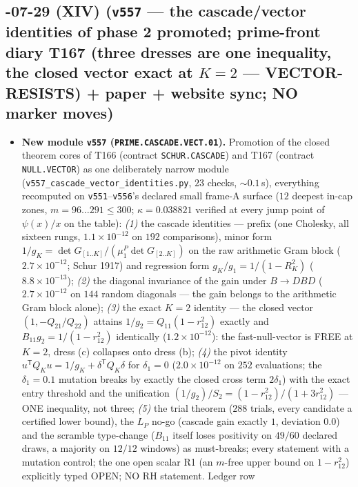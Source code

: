 \documentclass[11pt]{article}
\begin{document}
\subsection*{-07-29 (XIV) (\texttt{v557} --- the cascade/vector identities of phase 2 promoted; prime-front diary T167 (three dresses are one inequality, the closed vector exact at $K=2$ --- VECTOR-RESISTS) + paper + website sync; NO marker moves)}
\begin{itemize}[leftmargin=1.5em]
\item \textbf{New module \texttt{v557} (\texttt{PRIME.CASCADE.VECT.01}).} Promotion of
the closed theorem cores of T166 (contract \texttt{SCHUR.CASCADE}) and T167 (contract
\texttt{NULL.VECTOR}) as one deliberately narrow module
(\texttt{v557\_cascade\_vector\_identities.py}, $23$ checks, ${\sim}0.1$\,s), everything
recomputed on \texttt{v551}--\texttt{v556}'s declared small frame-A surface ($12$ deepest
in-cap zones, $m=96\ldots291\le300$; $\kappa=0.038821$ verified at every jump point of
$\psi(x)/x$ on the table): \emph{(1)} the cascade identities --- prefix (one Cholesky,
all sixteen rungs, $1.1\times10^{-12}$ on $192$ comparisons), minor form
$1/g_K=\det G_{[1..K]}/(\mu^P_1\det G_{[2..K]})$ on the raw arithmetic Gram block
($2.7\times10^{-12}$; Schur 1917) and regression form $g_K/g_1=1/(1-R_K^2)$
($8.8\times10^{-13}$); \emph{(2)} the diagonal invariance of the gain under $B\to DBD$
($2.7\times10^{-12}$ on $144$ random diagonals --- the gain belongs to the arithmetic
Gram block alone); \emph{(3)} the exact $K=2$ identity --- the closed vector
$(1,-Q_{21}/Q_{22})$ attains $1/g_2=Q_{11}(1-r_{12}^2)$ exactly and
$B_{11}g_2=1/(1-r_{12}^2)$ identically ($1.2\times10^{-12}$): the fast-null-vector is
FREE at $K=2$, dress (c) collapses onto dress (b); \emph{(4)} the pivot identity
$u^{\mathsf T}Q_Ku=1/g_K+\delta^{\mathsf T}Q_K\delta$ for $\delta_1=0$
($2.0\times10^{-12}$ on $252$ evaluations; the $\delta_1=0.1$ mutation breaks by exactly
the closed cross term $2\delta_1$) with the exact entry threshold and the unification
$(1/g_2)/S_2=(1-r_{12}^2)/(1+3r_{12}^2)$ --- ONE inequality, not three; \emph{(5)} the
trial theorem ($288$ trials, every candidate a certified lower bound), the $L_P$ no-go
(cascade gain exactly $1$, deviation $0.0$) and the scramble type-change ($B_{11}$
itself loses positivity on $49/60$ declared draws, a majority on $12/12$ windows) as
must-breaks; every statement with a mutation control; the one open scalar R1 (an
$m$-free upper bound on $1-r_{12}^2$) explicitly typed OPEN; NO RH statement. Ledger row

\end{itemize}
\end{document}

